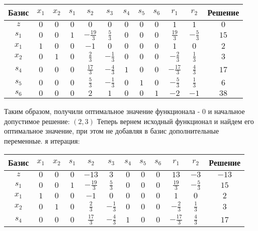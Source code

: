 \documentclass{article}%
\begin{document}
\begin{flushleft}
\newline%
\newline%
\renewcommand{\arraystretch}{1.3}%
\begin{tabular}{|c|cccccccccc|c|}%
\hline%
Базис&$x_{1}$&$x_{2}$&$s_{1}$&$s_{2}$&$s_{3}$&$s_{4}$&$s_{5}$&$s_{6}$&$r_{1}$&$r_{2}$&Решение\\%
\hline%
$z$&$0$&$0$&$0$&$0$&$0$&$0$&$0$&$0$&$1$&$1$&$0$\\%
\hline%
$s_{1}$&$0$&$0$&$1$&$-\frac{19}{3}$&$\frac{5}{3}$&$0$&$0$&$0$&$\frac{19}{3}$&$-\frac{5}{3}$&$15$\\%
$x_{1}$&$1$&$0$&$0$&$-1$&$0$&$0$&$0$&$0$&$1$&$0$&$2$\\%
$x_{2}$&$0$&$1$&$0$&$\frac{2}{3}$&$-\frac{1}{3}$&$0$&$0$&$0$&$-\frac{2}{3}$&$\frac{1}{3}$&$3$\\%
$s_{4}$&$0$&$0$&$0$&$\frac{17}{3}$&$-\frac{4}{3}$&$1$&$0$&$0$&$-\frac{17}{3}$&$\frac{4}{3}$&$17$\\%
$s_{5}$&$0$&$0$&$0$&$\frac{5}{3}$&$-\frac{1}{3}$&$0$&$1$&$0$&$-\frac{5}{3}$&$\frac{1}{3}$&$6$\\%
$s_{6}$&$0$&$0$&$0$&$2$&$1$&$0$&$0$&$1$&$-2$&$-1$&$38$\\%
\hline%
\end{tabular}%
\newline%
\newline%
Таким образом, получили оптимальное значение функционала {-} 0 и начальное допустимое решение: %
$(2, 3)$%
\newline%
Теперь вернем исходный функционал и найдем его оптимальное значение, при этом не добавляя в базис дополнительные переменные.%
я итерация: %
\newline%
\newline%
\renewcommand{\arraystretch}{1.3}%
\begin{tabular}{|c|cccccccccc|c|}%
\hline%
Базис&$x_{1}$&$x_{2}$&$s_{1}$&$s_{2}$&$s_{3}$&$s_{4}$&$s_{5}$&$s_{6}$&$r_{1}$&$r_{2}$&Решение\\%
\hline%
$z$&$0$&$0$&$0$&$-13$&$3$&$0$&$0$&$0$&$13$&$-3$&$-13$\\%
\hline%
$s_{1}$&$0$&$0$&$1$&$-\frac{19}{3}$&$\frac{5}{3}$&$0$&$0$&$0$&$\frac{19}{3}$&$-\frac{5}{3}$&$15$\\%
$x_{1}$&$1$&$0$&$0$&$-1$&$0$&$0$&$0$&$0$&$1$&$0$&$2$\\%
$x_{2}$&$0$&$1$&$0$&$\frac{2}{3}$&$-\frac{1}{3}$&$0$&$0$&$0$&$-\frac{2}{3}$&$\frac{1}{3}$&$3$\\%
$s_{4}$&$0$&$0$&$0$&$\frac{17}{3}$&$-\frac{4}{3}$&$1$&$0$&$0$&$-\frac{17}{3}$&$\frac{4}{3}$&$17$\\%

\end{tabular}
\end{flushleft}
\end{document}
